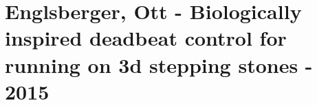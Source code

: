 \section{Englsberger, Ott - Biologically inspired deadbeat control for running on 3d stepping stones - 2015}